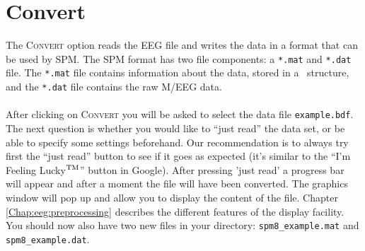 \section{Convert}
The \textsc{Convert} option reads the EEG file and writes the data in a format that can be used by SPM. The SPM format has two file components: a \texttt{*.mat} and \texttt{*.dat} file. The \texttt{*.mat} file contains information about the data, stored in a \matlab\ structure, and the \texttt{*.dat} file contains the raw M/EEG data.
\\
\\
After clicking on \textsc{Convert} you will be asked to select the data file \texttt{example.bdf}. The next question is whether you would like to ``just read'' the data set, or be able to specify some settings beforehand. Our recommendation is to always try first the ``just read'' button to see if it goes as expected (it's similar to the ``I'm Feeling Lucky\leavevmode\hbox{$\rm {}^{TM}$}'' button in Google). After pressing 'just read' a progress bar will appear and after a moment the file will have been converted. The graphics window will pop up and allow you to display the content of the file. Chapter \ref{Chap:eeg:preprocessing} describes the different features of the display facility. You should now also have two new files in your directory: \texttt{spm8\_example.mat} and \texttt{spm8\_example.dat}.

